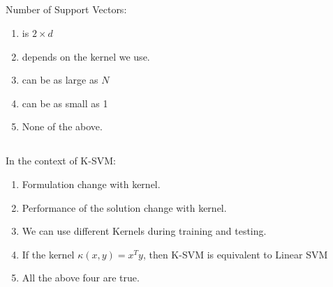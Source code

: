 \begin{frame}
\section{}
Number of Support Vectors:
\begin{enumerate}[label=(\Alph*)]
\item is $2\times d$
\item depends on the kernel we use.   %
\item can be as large as $N$    %
\item can be as small as 1
\item None of the above.    %
\end{enumerate}
\end{frame}

\begin{frame}
\section{}
In the context of K-SVM:
\begin{enumerate}[label=(\Alph*)]
\item Formulation change with kernel.
\item Performance of the solution change with kernel.   %
\item We can use different Kernels during training and testing.
\item If the kernel $\kappa(x,y) = x^Ty$, then K-SVM is equivalent to Linear SVM    %
\item All the above four are true.  %
\end{enumerate}
\end{frame}
